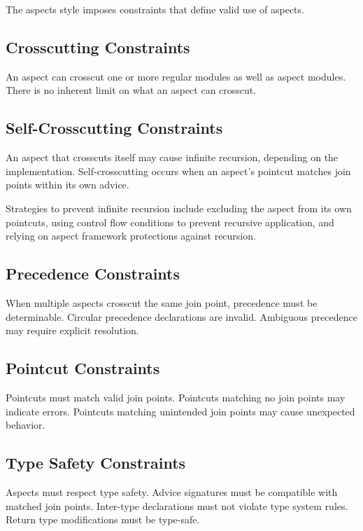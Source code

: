\documentclass[11pt]{article}
\begin{document}
The aspects style imposes constraints that define valid use of aspects.

\subsection{Crosscutting Constraints}

An aspect can crosscut one or more regular modules as well as aspect modules. There is no inherent limit on what an aspect can crosscut.

\subsection{Self-Crosscutting Constraints}

An aspect that crosscuts itself may cause infinite recursion, depending on the implementation. Self-crosscutting occurs when an aspect's pointcut matches join points within its own advice.

Strategies to prevent infinite recursion include excluding the aspect from its own pointcuts, using control flow conditions to prevent recursive application, and relying on aspect framework protections against recursion.

\subsection{Precedence Constraints}

When multiple aspects crosscut the same join point, precedence must be determinable. Circular precedence declarations are invalid. Ambiguous precedence may require explicit resolution.

\subsection{Pointcut Constraints}

Pointcuts must match valid join points. Pointcuts matching no join points may indicate errors. Pointcuts matching unintended join points may cause unexpected behavior.

\subsection{Type Safety Constraints}

Aspects must respect type safety. Advice signatures must be compatible with matched join points. Inter-type declarations must not violate type system rules. Return type modifications must be type-safe.
\end{document}
